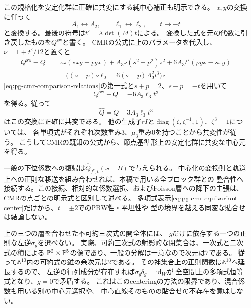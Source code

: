 \begin{remark}[節点型の既知の明示中心元との関係]
この規格化を安定化群に正確に共変にする純中心補正も明示できる。
$x,y$の交換に伴って
\begin{equation}
 A_1\leftrightarrow A_2,\qquad
 \ell_1\leftrightarrow\ell_2,\qquad t\longmapsto-t
 \label{eq:pg-cmr-swap-action}
\end{equation}
と変換する。最後の符号は$t'=\lambda\det(M)t$による。
変換した式を元の代数に引き戻したものを$Q^{\mathrm{sw}}$と書く。
CMRの公式に上のパラメータを代入し、$\nu=1+t^2/12$と置くと
\begin{equation}
 \begin{aligned}
 Q^{\mathrm{sw}}-Q
 &=\nu z(sxy-pyx)+A_3\nu(s^2-p^2)z^2
      +6A_3t^2(pyx-sxy)\\
 &\quad+\bigl((s-p)\nu\ell_3+6(s+p)A_3^2t^3\bigr)z.
 \end{aligned}
 \label{eq:pg-cmr-swap-computation}
\end{equation}
\eqref{eq:pg-cmr-comparison-relations}の第一式と$s+p=2$、$s-p=-t$を用いて
\begin{equation}
 Q^{\mathrm{sw}}-Q=-6A_3\ell_3t^3
 \label{eq:pg-cmr-swap-discrepancy}
\end{equation}
を得る。従って
\begin{equation}
 \widehat Q=Q-3A_3\ell_3t^3
 \label{eq:pg-cmr-equivariant-center}
\end{equation}
はこの交換に正確に共変である。
他の生成子$rI$と$\operatorname{diag}(\zeta,\zeta^{-1},1)$、$\zeta^3=1$については、
各単項式がそれぞれ次数重み$3$、$\mu_3$重み$0$を持つことから共変性が従う。
こうしてCMRの既知の公式から、節点基準形上の安定化群に共変な中心元を得る。

一般の下位係数への復帰は$\widehat Q_{f^0,t}(x+B)$で与えられる。
中心化の変換則と軌道上への正則な移送を組み合わせれば、本稿で用いる全ブロック群との
整合性へ接続する。この接続、相対的な係数選択、およびPoisson層への降下の主張は、
CMRの点ごとの明示式と区別して述べる。
多項式表示\eqref{eq:pg-cmr-equivariant-center}だけから、$t=\pm2$でのPBW性・平坦性や
型の境界を越える同変な貼合せは結論しない。
\end{remark}

\begin{remark}[層ごとの選択と貼合せの限界]
\label{rem:pg-equivariant-stratumwise-centering}
上の三つの層を合わせた不可約三次式の開全体には、
$g$だけに依存する一つの正則な左逆$\sigma_g$を選べない。
実際、可約三次式の射影的な閉集合は、一次式と二次式の積による
$\mathbb P^2\times\mathbb P^5$の像であり、一般の分解は一意なので次元は$7$である。
従って$\mathbb A^{10}$内の可約式の錐の余次元は$2$である。
その補集合上の正則関数は$\mathbb A^{10}$へ延長するので、
左逆の行列成分が存在すれば$\sigma_g\delta_g=\mathrm{id}_W$が
全空間上の多項式恒等式となり、$g=0$で矛盾する。
これはこのcenteringの方法の限界であり、混合係数も用いる別の中心元選択や、
中心直線そのものの貼合せの不存在を意味しない。
\end{remark}

